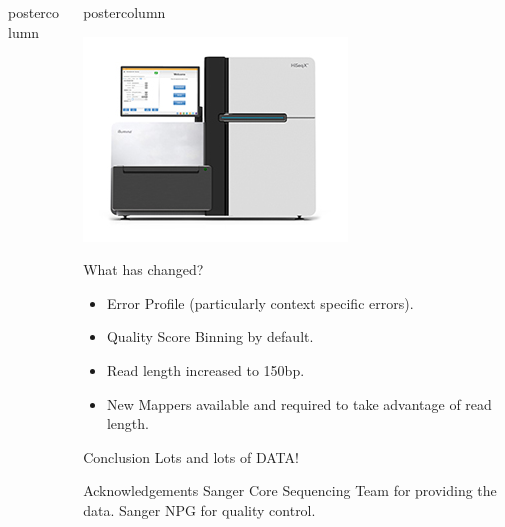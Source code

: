 \documentclass[final]{beamer}
\begin{document}
\begin{frame}
\begin{columns}
\begin{column}{.49\textwidth}
\begin{beamercolorbox}[center,wd=\textwidth]{postercolumn}
\begin{minipage}[T]{.95\textwidth}
            \end{minipage}
        \end{beamercolorbox}
    \end{column}
        \begin{column}{.49\textwidth}
        \begin{beamercolorbox}[center,wd=\textwidth]{postercolumn}
            \begin{minipage}[T]{.95\textwidth}  %
            \parbox[t][\columnheight]{\textwidth}{
            \begin{block}{}
                \includegraphics[width=.95\linewidth]{images/hiseq-x}
            \end{block}
            \begin{block}{What has changed?}
                \begin{itemize}
                    \item Error Profile (particularly context specific errors).
                    \item Quality Score Binning by default.
                    \item Read length increased to 150bp.
                    \item New Mappers available and required to take advantage of read length.
                \end{itemize}
            \end{block}
            \begin{block}{Conclusion}
                Lots and lots of DATA!
            \end{block}
            \begin{block}{Acknowledgements}
                Sanger Core Sequencing Team for providing the data. Sanger NPG for quality control.
            \end{block}
            \vfill
                      }


\end{minipage}
\end{beamercolorbox}
\end{column}
\end{columns}
\end{frame}
\end{document}
